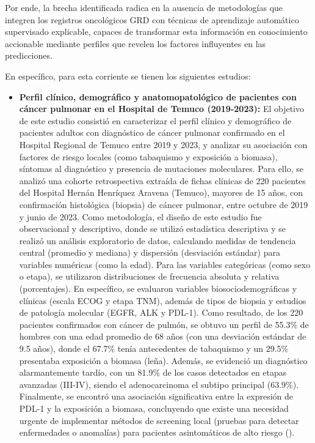 Por ende, la brecha identificada radica en la ausencia de metodologías que integren los registros oncológicos GRD con técnicas de aprendizaje automático supervisado explicable, capaces de transformar esta información en conocimiento accionable mediante perfiles que revelen los factores influyentes en las predicciones.

En específico, para esta corriente se tienen los siguientes estudios:

\begin{itemize}
\item \textbf{Perfil clínico, demográfico y anatomopatológico de pacientes con cáncer pulmonar en el Hospital de Temuco (2019-2023):} El objetivo de este estudio consistió en caracterizar el perfil clínico y demográfico de pacientes adultos con diagnóstico de cáncer pulmonar confirmado en el Hospital Regional de Temuco entre 2019 y 2023, y analizar su asociación con factores de riesgo locales (como tabaquismo y exposición a biomasa), síntomas al diagnóstico y presencia de mutaciones moleculares. Para ello, se analizó una cohorte retrospectiva extraída de fichas clínicas de 220 pacientes del Hospital Hernán Henríquez Aravena (Temuco), mayores de 15 años, con confirmación histológica (biopsia) de cáncer pulmonar, entre octubre de 2019 y junio de 2023. Como metodología, el diseño de este estudio fue observacional y descriptivo, donde se utilizó estadística descriptiva y se realizó un análisis exploratorio de datos, calculando medidas de tendencia central (promedio y mediana) y dispersión (desviación estándar) para variables numéricas (como la edad). Para las variables categóricas (como sexo o etapa), se utilizaron distribuciones de frecuencia absoluta y relativa (porcentajes). En específico, se evaluaron variables biosociodemográficas y clínicas (escala ECOG y etapa TNM), además de tipos de biopsia y estudios de patología molecular (EGFR, ALK y PDL-1). Como resultado, de los 220 pacientes confirmados con cáncer de pulmón, se obtuvo un perfil de 55.3\% de hombres con una edad promedio de 68 años (con una desviación estándar de 9.5 años), donde el 67.7\% tenía antecedentes de tabaquismo y un 29.5\% presentaba exposición a biomasa (leña). Además, se evidenció un diagnóstico alarmantemente tardío, con un 81.9\% de los casos detectados en etapas avanzadas (III-IV), siendo el adenocarcinoma el subtipo principal (63.9\%). Finalmente, se encontró una asociación significativa entre la expresión de PDL-1 y la exposición a biomasa, concluyendo que existe una necesidad urgente de implementar métodos de screening local (pruebas para detectar enfermedades o anomalías) para pacientes asintomáticos de alto riesgo (\cite{scielo1}).

\end{itemize}
